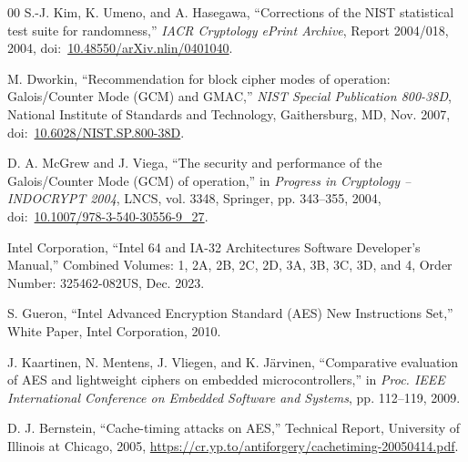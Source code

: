 \documentclass[review,12pt]{elsarticle}
\begin{document}
\begin{thebibliography}{00}
S.-J. Kim, K. Umeno, and A. Hasegawa, ``Corrections of the NIST statistical test suite for randomness,'' \textit{IACR Cryptology ePrint Archive}, Report 2004/018, 2004, doi:~\href{https://doi.org/10.48550/arXiv.nlin/0401040}{10.48550/arXiv.nlin/0401040}.

M. Dworkin, ``Recommendation for block cipher modes of operation: Galois/Counter Mode (GCM) and GMAC,'' \textit{NIST Special Publication 800-38D}, National Institute of Standards and Technology, Gaithersburg, MD, Nov. 2007, doi:~\href{https://doi.org/10.6028/NIST.SP.800-38D}{10.6028/NIST.SP.800-38D}.

D. A. McGrew and J. Viega, ``The security and performance of the Galois/Counter Mode (GCM) of operation,'' in \textit{Progress in Cryptology -- INDOCRYPT 2004}, LNCS, vol. 3348, Springer, pp. 343--355, 2004, doi:~\href{https://doi.org/10.1007/978-3-540-30556-9_27}{10.1007/978-3-540-30556-9\_27}.

Intel Corporation, ``Intel 64 and IA-32 Architectures Software Developer's Manual,'' Combined Volumes: 1, 2A, 2B, 2C, 2D, 3A, 3B, 3C, 3D, and 4, Order Number: 325462-082US, Dec. 2023.

S. Gueron, ``Intel Advanced Encryption Standard (AES) New Instructions Set,'' White Paper, Intel Corporation, 2010.

J. Kaartinen, N. Mentens, J. Vliegen, and K. J{\"a}rvinen, ``Comparative evaluation of AES and lightweight ciphers on embedded microcontrollers,'' in \textit{Proc. IEEE International Conference on Embedded Software and Systems}, pp. 112--119, 2009.

D. J. Bernstein, ``Cache-timing attacks on AES,'' Technical Report, University of Illinois at Chicago, 2005, \url{https://cr.yp.to/antiforgery/cachetiming-20050414.pdf}.

\end{thebibliography}
\end{document}
